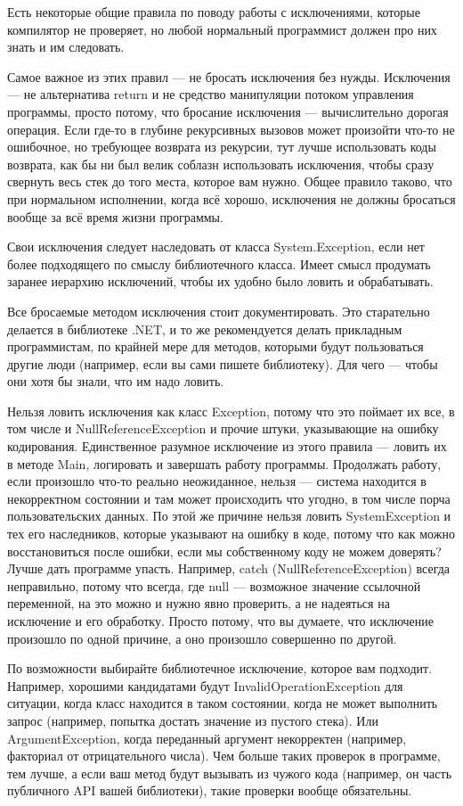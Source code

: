 \documentclass[a5paper]{article}
\begin{document}
Есть некоторые общие правила по поводу работы с исключениями, которые компилятор не проверяет, но любой нормальный программист должен про них знать и им следовать.

Самое важное из этих правил --- не бросать исключения без нужды. Исключения --- не альтернатива return и не средство манипуляции потоком управления программы, просто потому, что бросание исключения --- вычислительно дорогая операция. Если где-то в глубине рекурсивных вызовов может произойти что-то не ошибочное, но требующее возврата из рекурсии, тут лучше использовать коды возврата, как бы ни был велик соблазн использовать исключения, чтобы сразу свернуть весь стек до того места, которое вам нужно. Общее правило таково, что при нормальном исполнении, когда всё хорошо, исключения не должны бросаться вообще за всё время жизни программы.

Свои исключения следует наследовать от класса System.Exception, если нет более подходящего по смыслу библиотечного класса. Имеет смысл продумать заранее иерархию исключений, чтобы их удобно было ловить и обрабатывать.

Все бросаемые методом исключения стоит документировать. Это старательно делается в библиотеке .NET, и то же рекомендуется делать прикладным программистам, по крайней мере для методов, которыми будут пользоваться другие люди (например, если вы сами пишете библиотеку). Для чего --- чтобы они хотя бы знали, что им надо ловить.

Нельзя ловить исключения как класс Exception, потому что это поймает их все, в том числе и NullReferenceException и прочие штуки, указывающие на ошибку кодирования. Единственное разумное исключение из этого правила --- ловить их в методе Main, логировать и завершать работу программы. Продолжать работу, если произошло что-то реально неожиданное, нельзя --- система находится в некорректном состоянии и там может происходить что угодно, в том числе порча пользовательских данных. По этой же причине нельзя ловить SystemException и тех его наследников, которые указывают на ошибку в коде, потому что как можно восстановиться после ошибки, если мы собственному коду не можем доверять? Лучше дать программе упасть. Например, catch (NullReferenceException) всегда неправильно, потому что всегда, где null --- возможное значение ссылочной переменной, на это можно и нужно явно проверить, а не надеяться на исключение и его обработку. Просто потому, что вы думаете, что исключение произошло по одной причине, а оно произошло совершенно по другой.

По возможности выбирайте библиотечное исключение, которое вам подходит. Например, хорошими кандидатами будут InvalidOperationException для ситуации, когда класс находится в таком состоянии, когда не может выполнить запрос (например, попытка достать значение из пустого стека). Или ArgumentException, когда переданный аргумент некорректен (например, факториал от отрицательного числа). Чем больше таких проверок в программе, тем лучше, а если ваш метод будут вызывать из чужого кода (например, он часть публичного API вашей библиотеки), такие проверки вообще обязательны.
\end{document}

